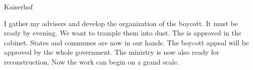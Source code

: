 Kaiserhof

I gather my advisers and develop the organization of the boycott. It must be ready by evening. We want to trample them into dust. The  is approved in the cabinet. States and communes are now in our hands. The boycott appeal will be approved by the whole government. The ministry is now also ready for reconstruction. Now the work can begin on a grand scale.

